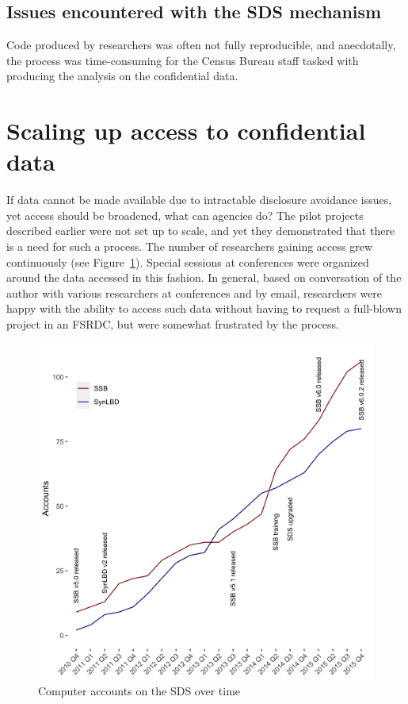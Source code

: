 \documentclass[]{hdsr}
\begin{document}
\restoregeometry
{}


\subsection{Issues encountered with the SDS mechanism}

Code produced by researchers was often not fully reproducible, and anecdotally, the process was time-consuming for the Census Bureau staff tasked with producing the analysis on the confidential data.

\section{Scaling up access to confidential data}

If data cannot be made available due to intractable disclosure avoidance issues, yet access should be broadened, what can agencies do? 
The pilot projects described earlier were not set up to scale, and yet they demonstrated that there is a need for such a process. The number of researchers gaining access grew continuously (see Figure~\ref{fig:growth_in_sds}). Special sessions at conferences were organized around the data accessed in this fashion. In general, based on conversation of the author with various researchers at conferences and by email, researchers were happy with the ability to access such data without having to request a full-blown project in an FSRDC, but were somewhat frustrated by the process. 

\begin{figure}
    \centering
    \includegraphics[width=\textwidth]{figs/accounts-2015.png}
    \caption{Computer accounts on the SDS over time}
    \label{fig:growth_in_sds}
\end{figure}
\end{document}
